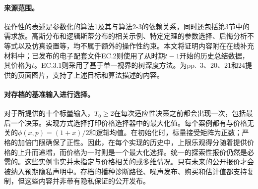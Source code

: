 \documentclass{article}
\begin{document}
\paragraph{来源范围。}
操作性的表述是参数化的算法1及其与算法2-3的依赖关系，同时还包括第3节中的需求族。高斯分布和逻辑斯蒂分布的相关示例、特定定理的参数选择、后悔分析不等式以及仿真设置等，均不属于额外的操作性约束。本文将证明内容附在在线补充材料中；已发布的电子配套文件EC.2则使用了从时期$t-1$开始的历史总结数据，其价格为$t$。EC.3.1则采用了基于单一视界的树深度方法。为pp.~3、20、21和24提供的页面图片，支持了上述目标和算法描述的内容。


\paragraph{对存档的基准输入进行选择。}
对于所提供的十个标量输入，\(T_0\geq2\)在每次适应性决策之前都会出现一次，包括最后一个决策。实现方式选择打印价格选择器中的最大化值。每个案例都有与价格无关的\(\phi(x,p)=(1+x)/2\)和逻辑均值。在初始化时，标量接受矩阵为正数；严格的加倍门限确保了正性。因此，在每个实现的历史中，上限乐观得分随着提供价格的上升而递增，而价格为一时则是一个最大化选择。统一的探索性报价仍然是必需的。这些实例事实并未指定与价格相关的或多维情况。只有未来的公开报价才会被纳入预期隐私声明中。存档的播种诊断路径、噪声发布、购买和估计值都支持复制，但这些内容并非带有隐私保证的公开发布。
\end{document}
